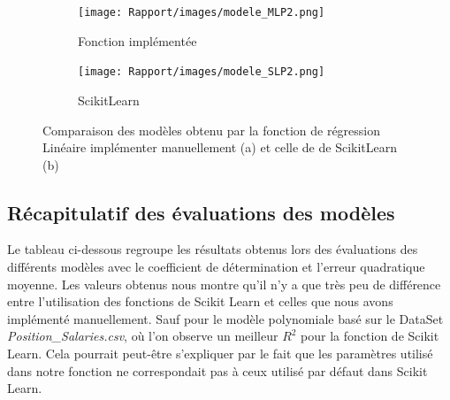 \documentclass[french]{article}
\begin{document}
\begin{figure}[!htbp]
    \centering
    \begin{subfigure}[b]{0.49\textwidth}
         \centering
         \texttt{[image: Rapport/images/modele\_MLP2.png]}
         \caption{Fonction implémentée}
        \label{fig:modele_LP1}
    \end{subfigure}
    \begin{subfigure}[b]{0.5\textwidth}
         \centering
         \texttt{[image: Rapport/images/modele\_SLP2.png]}
         \caption{ScikitLearn}
        \label{fig:modele_SLLP1}
    \end{subfigure}
    \caption{Comparaison des modèles obtenu par la fonction de régression Linéaire implémenter manuellement (a) et celle de de ScikitLearn (b)}
\end{figure}

\newpage

\subsection{Récapitulatif des évaluations des modèles}

Le tableau ci-dessous regroupe les résultats obtenus lors des évaluations des différents modèles avec le coefficient de détermination et l'erreur quadratique moyenne. Les valeurs obtenus nous montre qu'il n'y a que très peu de différence entre l'utilisation des fonctions de Scikit Learn et celles que nous avons implémenté manuellement. Sauf pour le modèle polynomiale basé sur le DataSet \textit{Position\_Salaries.csv}, où l'on observe un meilleur $R^{2}$ pour la fonction de Scikit Learn. Cela pourrait peut-être s'expliquer par le fait que les paramètres utilisé dans notre fonction ne correspondait pas à ceux utilisé par défaut dans Scikit Learn.\\
\end{document}
